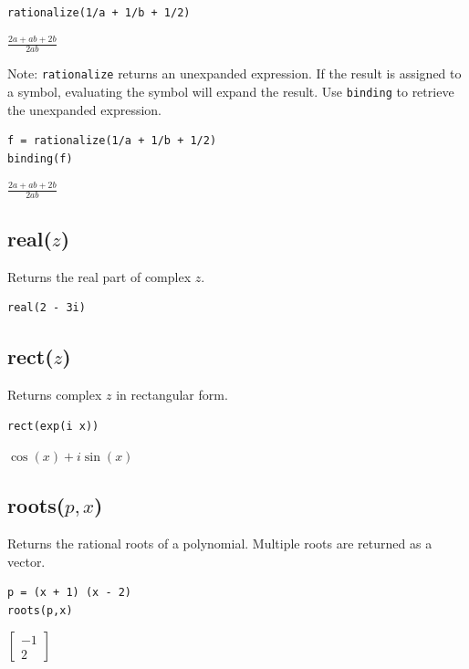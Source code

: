 \documentclass[12pt]{article}
\begin{document}
{\color{blue}
\begin{verbatim}
rationalize(1/a + 1/b + 1/2)
\end{verbatim}
}

\noindent
$\displaystyle \frac{2a+ab+2b}{2ab}$

\bigskip
\noindent
Note:
\verb$rationalize$
returns an unexpanded expression.
If the result is assigned to a symbol, evaluating the symbol will expand the result.
Use
\verb$binding$
to retrieve the unexpanded expression.

{\color{blue}
\begin{verbatim}
f = rationalize(1/a + 1/b + 1/2)
binding(f)
\end{verbatim}
}

\noindent
$\displaystyle \frac{2a+ab+2b}{2ab}$

\subsection*{real($z$)}

Returns the real part of complex $z$.

{\color{blue}
\begin{verbatim}
real(2 - 3i)
\end{verbatim}
}


\subsection*{rect($z$)}

Returns complex $z$ in rectangular form.

{\color{blue}
\begin{verbatim}
rect(exp(i x))
\end{verbatim}
}

\noindent
$\displaystyle \cos(x)+i\sin(x)$

\subsection*{roots($p,x$)}

Returns the rational roots of a polynomial.
Multiple roots are returned as a vector.

{\color{blue}
\begin{verbatim}
p = (x + 1) (x - 2)
roots(p,x)
\end{verbatim}
}

\noindent
$\displaystyle
\begin{bmatrix}
-1
\\[1ex]
2
\end{bmatrix}
$
\end{document}
